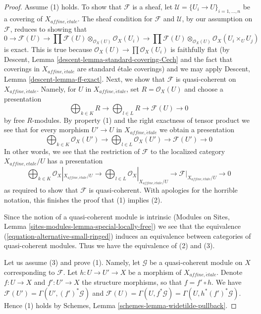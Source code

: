 \documentclass{stacks-project}
\theoremstyle{plain}
\theoremstyle{definition}
\theoremstyle{remark}
\numberwithin{equation}{subsection}
\def\etale{{\acute{e}tale}}
\begin{document}
\begin{proof}
Assume (1) holds. To show that $\mathcal{F}$ is a sheaf, let
$\mathcal{U} = \{U_i \to U\}_{i = 1, \ldots, n}$ be a covering
of $X_{affine, \etale}$. The sheaf condition for $\mathcal{F}$
and $\mathcal{U}$, by our assumption on $\mathcal{F}$,
reduces to showing that
$$
0 \to \mathcal{F}(U) \to
\prod \mathcal{F}(U) \otimes_{\mathcal{O}_X(U)} \mathcal{O}_X(U_i) \to
\prod \mathcal{F}(U) \otimes_{\mathcal{O}_X(U)} \mathcal{O}_X(U_i \times_U U_j)
$$
is exact. This is true because $\mathcal{O}_X(U) \to \prod \mathcal{O}_X(U_i)$
is faithfully flat
(by Descent, Lemma \ref{descent-lemma-standard-covering-Cech} and
the fact that coverings in $X_{affine, \etale}$ are standard \'etale
coverings) and we may apply Descent, Lemma \ref{descent-lemma-ff-exact}.
Next, we show that $\mathcal{F}$ is quasi-coherent on $X_{affine, \etale}$.
Namely, for $U$ in $X_{affine, \etale}$, set $R = \mathcal{O}_X(U)$
and choose a presentation
$$
\bigoplus\nolimits_{k \in K} R
\longrightarrow
\bigoplus\nolimits_{l \in L} R
\longrightarrow
\mathcal{F}(U)
\longrightarrow 0
$$
by free $R$-modules. By property (1) and the right exactness of tensor product
we see that for every morphism $U' \to U$ in $X_{affine, \etale}$
we obtain a presentation
$$
\bigoplus\nolimits_{k \in K} \mathcal{O}_X(U')
\longrightarrow
\bigoplus\nolimits_{l \in L} \mathcal{O}_X(U')
\longrightarrow
\mathcal{F}(U')
\longrightarrow 0
$$
In other words, we see that the restriction of $\mathcal{F}$
to the localized category $X_{affine, etale}/U$ has a presentation
$$
\bigoplus\nolimits_{k \in K} \mathcal{O}_X|_{X_{affine, \etale}/U}
\longrightarrow
\bigoplus\nolimits_{l \in L} \mathcal{O}_X|_{X_{affine, \etale}/U}
\longrightarrow
\mathcal{F}|_{X_{affine, \etale}/U}
\longrightarrow 0
$$
as required to show that $\mathcal{F}$ is quasi-coherent.
With apologies for the horrible notation, this finishes the proof
that (1) implies (2).

\medskip\noindent
Since the notion of a quasi-coherent module is intrinsic
(Modules on Sites, Lemma \ref{sites-modules-lemma-special-locally-free})
we see that the equivalence (\ref{equation-alternative-small-ringed})
induces an equivalence between categories of quasi-coherent modules.
Thus we have the equivalence of (2) and (3).

\medskip\noindent
Let us assume (3) and prove (1). Namely, let
$\mathcal{G}$ be a quasi-coherent module on $X$ corresponding to $\mathcal{F}$.
Let $h : U \to U' \to X$ be a morphism of $X_{affine, \etale}$.
Denote $f : U \to X$ and $f' : U' \to X$ the structure morphisms,
so that $f = f' \circ h$. We have
$\mathcal{F}(U') = \Gamma(U', (f')^*\mathcal{G})$ and
$\mathcal{F}(U) = \Gamma(U, f^*\mathcal{G}) = \Gamma(U, h^*(f')^*\mathcal{G})$.
Hence (1) holds by Schemes, Lemma \ref{schemes-lemma-widetilde-pullback}.
\end{proof}
\end{document}
